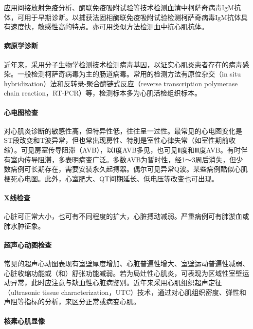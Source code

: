 应用间接放射免疫分析、酶联免疫吸附试验等技术检测血清中柯萨奇病毒IgM抗体，可用于早期诊断。以捕获法固相酶联免疫吸附试验检测柯萨奇病毒IgM抗体具有速度快，敏感性高的特点。亦可用类似方法检测血中抗心肌抗体。

\paragraph{病原学诊断}

近年来，采用分子生物学检测技术检测病毒基因，以证实心肌炎患者存在的病毒感染。一般检测柯萨奇病毒为主的肠道病毒。常用的检测方法有原位杂交（in
situ hybridization）法和反转录-聚合酶链式反应（reverse transcription
polymerase chain reaction，RT-PCR）等，检测标本多为心肌活检组织标本。

\paragraph{心电图检查}

对心肌炎诊断的敏感性高，但特异性低，往往呈一过性。最常见的心电图变化是ST段改变和T波异常，但也常出现房性、特别是室性心律失常（如室性期前收缩）。可见房室传导阻滞（AVB），以Ⅰ度AVB多见，也可见Ⅱ度和Ⅲ度AVB。有时伴有室内传导阻滞，多表明病变广泛。多数AVB为暂时性，经1～3周后消失，但少数病例可长期存在，需要安装永久起搏器。偶尔可见异常Q波。某些病例酷似心肌梗死心电图。此外，心室肥大、QT间期延长、低电压等改变也可出现。

\paragraph{X线检查}

心脏可正常大小，也可有不同程度的扩大，心脏搏动减弱。严重病例可有肺淤血或肺水肿征象。

\paragraph{超声心动图检查}

常见的超声心动图表现有室壁厚度增加、心脏普遍性增大、室壁运动普遍性减弱、心脏收缩功能或（和）舒张功能减弱。若为局灶性心肌炎，可表现为区域性室壁运动异常，此时应注意与缺血性心脏病鉴别。近年来采用心肌组织超声定征（ultrasonic
tissue
characterization，UTC）技术，通过对心肌组织密度、弹性和声阻等指标的分析，来区分正常或病变心肌。

\paragraph{核素心肌显像}

